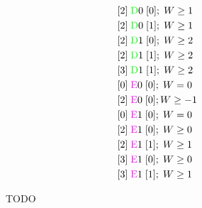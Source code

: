 \begin{figure}[h]
\begin{minipage}[t]{0.32\textwidth}
\begin{minipage}[t]{0.48\textwidth}
\begin{align*}
                 & \;[2]\; \text{\stateD}0\; [0];\; W \geq 1 \\
                 & \;[2]\; \text{\stateD}0\; [1];\; W \geq 1 \\
                 & \;[2]\; \text{\stateD}1\; [0];\; W \geq 2 \\
                 & \;[2]\; \text{\stateD}1\; [1];\; W \geq 2 \\
                 & \;[3]\; \text{\stateD}1\; [1];\; W \geq 2 \\
                 & \;[0]\; \text{\stateE}0\; [0];\; W = 0    \\
                 & \;[2]\; \text{\stateE}0\; [0]; W \geq -1  \\
                 & \;[0]\; \text{\stateE}1\; [0];\; W = 0    \\
                 & \;[2]\; \text{\stateE}1\; [0];\; W \geq 0 \\
                 & \;[2]\; \text{\stateE}1\; [1];\; W \geq 1 \\
                 & \;[3]\; \text{\stateE}1\; [0];\; W \geq 0 \\
                 & \;[3]\; \text{\stateE}1\; [1];\; W \geq 1 \\
            \end{align*}
        \end{minipage}


    \end{minipage}

    \caption{TODO}
\end{figure}